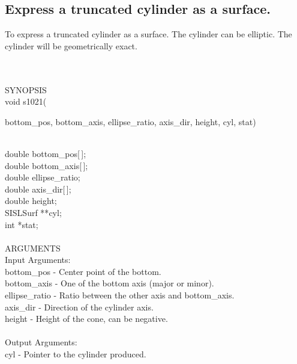 \subsection{Express a truncated cylinder as a surface.}
\begin{minipg1}
  To express a truncated cylinder as a surface. The cylinder can be
  elliptic.
  The cylinder will be geometrically exact.
\end{minipg1}\\ \\
SYNOPSIS\\
        \>void s1021(\begin{minipg3}
        {\fov bottom\_pos}, {\fov bottom\_axis}, {\fov ellipse\_ratio}, {\fov axis\_dir},
        {\fov height}, {\fov cyl}, {\fov stat})
      \end{minipg3}\\[0.3ex]
      \>\>    double \> {\fov bottom\_pos}[\,];\\
      \>\>    double \> {\fov bottom\_axis}[\,];\\
      \>\>    double \> {\fov ellipse\_ratio};\\
      \>\>    double \> {\fov axis\_dir}[\,];\\
      \>\>    double \> {\fov height};\\
      \>\>    SISLSurf \> **{\fov cyl};\\
      \>\>    int    \> *{\fov stat};\\
\\
ARGUMENTS\\
        \>Input Arguments:\\
        \>\>    {\fov bottom\_pos}  \> - \> Center point of the bottom.\\
        \>\>    {\fov bottom\_axis} \> - \> One of the bottom axis
                                            (major or minor).\\
        \>\>    {\fov ellipse\_ratio} \> - \> Ratio between the other
                                              axis and bottom\_axis.\\
        \>\>    {\fov axis\_dir}    \> - \> Direction of the cylinder axis.\\
        \>\>    {\fov height}       \> - \> Height of the cone, can be negative.\\
\\
        \>Output Arguments:\\
        \>\>    {\fov cyl}  \> - \> Pointer to the cylinder produced.\\
